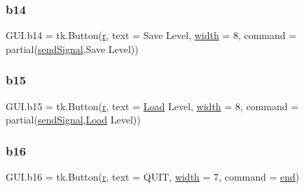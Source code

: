 \subsubsection{\texorpdfstring{b14}{b14}}
{\footnotesize\ttfamily G\+U\+I.\+b14 = tk.\+Button(\mbox{\hyperlink{_s_d_l__opengl_8h_a42ce7cdc612e53abee15043f80220d97}{r}}, text = \textquotesingle{}Save Level\textquotesingle{}, \mbox{\hyperlink{_s_d_l__opengl_8h_a9a82cf3caff84cabc4598e2619faac17}{width}} = 8, command = partial(\mbox{\hyperlink{namespace_g_u_i_ae82f740e6453cdd542b52ede1560c2c3}{send\+Signal}},\textquotesingle{}Save Level\textquotesingle{}))}

\mbox{\label{namespace_g_u_i_a88eaf4fa14b32d5a2a10202a201bbe88}} 
\subsubsection{\texorpdfstring{b15}{b15}}
{\footnotesize\ttfamily G\+U\+I.\+b15 = tk.\+Button(\mbox{\hyperlink{_s_d_l__opengl_8h_a42ce7cdc612e53abee15043f80220d97}{r}}, text = \textquotesingle{}\mbox{\hyperlink{_python-ast_8h_a7cc9da6a6307ea8052f27a18bd3d7d5bac40ec5db2990469fc236f4c5dea23edb}{Load}} Level\textquotesingle{}, \mbox{\hyperlink{_s_d_l__opengl_8h_a9a82cf3caff84cabc4598e2619faac17}{width}} = 8, command = partial(\mbox{\hyperlink{namespace_g_u_i_ae82f740e6453cdd542b52ede1560c2c3}{send\+Signal}},\textquotesingle{}\mbox{\hyperlink{_python-ast_8h_a7cc9da6a6307ea8052f27a18bd3d7d5bac40ec5db2990469fc236f4c5dea23edb}{Load}} Level\textquotesingle{}))}

\mbox{\label{namespace_g_u_i_a676b78f5c42c7f4c6c3e338e078dd0fb}} 
\subsubsection{\texorpdfstring{b16}{b16}}
{\footnotesize\ttfamily G\+U\+I.\+b16 = tk.\+Button(\mbox{\hyperlink{_s_d_l__opengl_8h_a42ce7cdc612e53abee15043f80220d97}{r}}, text = \textquotesingle{}Q\+U\+IT\textquotesingle{}, \mbox{\hyperlink{_s_d_l__opengl_8h_a9a82cf3caff84cabc4598e2619faac17}{width}} = 7, command = \mbox{\hyperlink{_s_d_l__opengl_8h_a432111147038972f06e049e18a837002}{end}})}

\mbox{\label{namespace_g_u_i_ac572e0369b73d3b0493771239995d91d}} 
